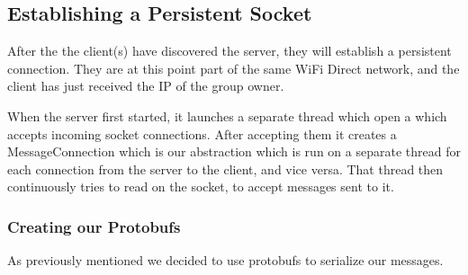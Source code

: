 \subsection{Establishing a Persistent Socket}

After the the client(s) have discovered the server, they will establish a persistent connection.
They are at this point part of the same WiFi Direct network, and the client has just received the IP of the group owner.

When the server first started, it launches a separate thread which open a  which accepts incoming socket connections.
After accepting them it creates a MessageConnection which is our abstraction which is run on a separate thread for each connection from the server to the client, and vice versa.
That thread then continuously tries to read on the socket, to accept messages sent to it.

\subsubsection*{Creating our Protobufs}
As previously mentioned we decided to use protobufs to serialize our messages.

